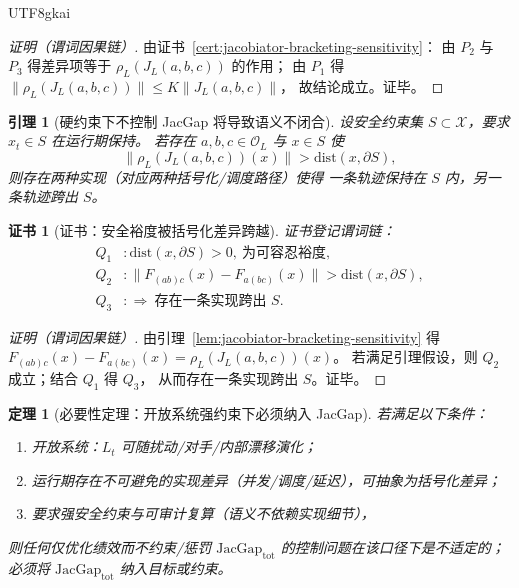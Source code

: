 \documentclass[12pt]{article}
\newtheorem{theorem}{定理}[section]
\newtheorem{lemma}{引理}[section]
\newtheorem{Certificate}{证书}[section]
\newcommand{\JacGap}{\ensuremath{\mathrm{JacGap}}} %
\begin{document}
\begin{CJK*}{UTF8}{gkai}
\begin{proof}[证明（谓词因果链）]
由证书~\ref{cert:jacobiator-bracketing-sensitivity}：
由 $P_2$ 与 $P_3$ 得差异项等于 $\rho_L(J_L(a,b,c))$ 的作用；
由 $P_1$ 得 $\|\rho_L(J_L(a,b,c))\|\le K\|J_L(a,b,c)\|$，
故结论成立。证毕。
\end{proof}

\begin{lemma}[硬约束下不控制 JacGap 将导致语义不闭合]
\label{lem:safety-nonclosure-without-jacgap}
设安全约束集 $S\subset\mathcal{X}$，要求 $x_t\in S$ 在运行期保持。
若存在 $a,b,c\in\mathcal{O}_L$ 与 $x\in S$ 使
\[
  \|\rho_L(J_L(a,b,c))(x)\|>\mathrm{dist}(x,\partial S),
\]
则存在两种实现（对应两种括号化/调度路径）使得
一条轨迹保持在 $S$ 内，另一条轨迹跨出 $S$。
\end{lemma}

\begin{Certificate}[证书：安全裕度被括号化差异跨越]
\label{cert:safety-nonclosure-without-jacgap}
证书登记谓词链：
\[
\begin{aligned}
  Q_1 &: \mathrm{dist}(x,\partial S)>0,\ \text{为可容忍裕度},\\
  Q_2 &: \|F_{(ab)c}(x)-F_{a(bc)}(x)\|> \mathrm{dist}(x,\partial S),\\
  Q_3 &: \Rightarrow\ \text{存在一条实现跨出 }S.
\end{aligned}
\]
\end{Certificate}

\begin{proof}[证明（谓词因果链）]
由引理~\ref{lem:jacobiator-bracketing-sensitivity} 得
$F_{(ab)c}(x)-F_{a(bc)}(x)=\rho_L(J_L(a,b,c))(x)$。
若满足引理假设，则 $Q_2$ 成立；结合 $Q_1$ 得 $Q_3$，
从而存在一条实现跨出 $S$。证毕。
\end{proof}

\begin{theorem}[必要性定理：开放系统强约束下必须纳入 JacGap]
\label{thm:necessity-jacgap}
若满足以下条件：
\begin{enumerate}
  \item 开放系统：$L_t$ 可随扰动/对手/内部漂移演化；
  \item 运行期存在不可避免的实现差异（并发/调度/延迟），可抽象为括号化差异；
  \item 要求强安全约束与可审计复算（语义不依赖实现细节），
\end{enumerate}
则任何仅优化绩效而不约束/惩罚 $\JacGap_{\mathrm{tot}}$ 的控制问题在该口径下是不适定的；
必须将 $\JacGap_{\mathrm{tot}}$ 纳入目标或约束。
\end{theorem}


\end{CJK*}
\end{document}

